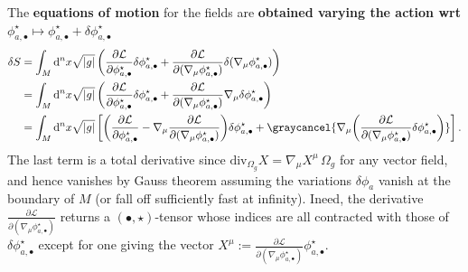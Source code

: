 \begin{mytheorem}
The \textbf{equations of motion} for the fields are \textbf{obtained varying the action wrt} $\phi^\star_{a,\bullet}\mapsto \phi_{a,\bullet}^\star + \delta \phi_{a,\bullet}^\star$ 
{\small
\begin{align}
    \delta S &= \int_M \mathrm{d}^n x \sqrt{|g|} \left( \frac{\partial \mathcal{L}}{\partial \phi^\star_{a,\bullet}} \delta \phi^\star_{a,\bullet} + \frac{\partial \mathcal{L}}{\partial (\nabla_\mu \phi^\star_{a,\bullet})} \delta (\nabla_\mu \phi^\star_{a,\bullet}) \right)
    \\
    &= \int_M \mathrm{d}^n x \sqrt{|g|} \left( \frac{\partial \mathcal{L}}{\partial \phi^\star_{a,\bullet}} \delta \phi^\star_{a,\bullet} + \frac{\partial \mathcal{L}}{\partial (\nabla_\mu \phi^\star_{a,\bullet})} \nabla_\mu \delta \phi^\star_{a,\bullet} \right)
    \\
    &= \int_M \mathrm{d}^n x \sqrt{|g|} \left[ \bigg(\frac{\partial \mathcal{L}}{\partial \phi^\star_{a,\bullet}} -  \nabla_\mu \frac{\partial \mathcal{L}}{\partial (\nabla_\mu \phi^\star_{a,\bullet})}\bigg) \delta \phi^\star_{a,\bullet} +  \graycancel{\nabla_\mu \bigg( \frac{\partial \mathcal{L}}{\partial (\nabla_\mu \phi^\star_{a,\bullet})} \delta\phi^\star_{a,\bullet}\bigg)}\right].
\end{align}
}
The last term is a total derivative since $\text{div}_{\Omega_g}X=\nabla_\mu X^\mu\,\Omega_g$ for any vector field, and hence vanishes by Gauss theorem assuming the variations $\delta \phi_a$ vanish at the boundary of $M$ (or fall off sufficiently fast at infinity).
Ineed, the derivative $\frac{\partial \mathcal{L}}{\partial (\nabla_\mu \phi^\star_{a,\bullet})}$ returns a $(\bullet,\star)$-tensor whose indices are all contracted with those of $\delta \phi_{a,\bullet}^\star$ except for one giving the vector $X^\mu:=\frac{\partial \mathcal{L}}{\partial (\nabla_\mu \phi^\star_{a,\bullet})}\phi^\star_{a,\bullet}$. 
%


\end{mytheorem}
